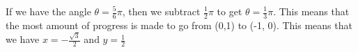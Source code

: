 \documentclass[preview]{standalone}
\begin{document}
\begin{center}
If we have the angle $\theta = \frac{5}{6} \pi$, then we subtract $\frac{1}{2} \pi$ to get $\theta = \frac{1}{3} \pi$. This means that the most amount of progress is made to go from (0,1) to (-1, 0). This means that we have $x= - \frac{\sqrt{3}}{2}$ and $y=\frac{1}{2}$
\end{center}
\end{document}

